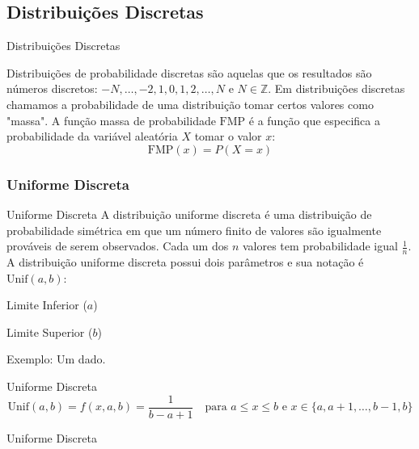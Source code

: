 \subsection{Distribuições Discretas}
\begin{frame}{Distribuições Discretas}
	\begin{defn}
		Distribuições de probabilidade discretas são aquelas que os resultados são números
		discretos: $-N, \dots, -2, 1, 0,1,2,\dots, N$ e $N \in \mathbb{Z}$. Em distribuições discretas chamamos a
		probabilidade de uma distribuição tomar certos valores como "massa". A função massa de probabilidade
		$\text{FMP}$ é a função que especifica a probabilidade da variável aleatória $X$ tomar o valor $x$:
		$$\text{FMP}(x) = P(X = x)$$
	\end{defn}
\end{frame}

\subsubsection{Uniforme Discreta}
\begin{frame}{Uniforme Discreta}
	A distribuição uniforme discreta é uma distribuição de probabilidade simétrica em que um número finito de valores
	são igualmente prováveis de serem observados. Cada um dos $n$ valores tem probabilidade igual $\frac{1}{n}$.
	\vfill
	A distribuição uniforme discreta possui dois parâmetros e sua notação é $\text{Unif}(a, b)$:
	\begin{vfilleditems}
		\item Limite Inferior ($a$)
		\item Limite Superior ($b$)
	\end{vfilleditems}
	\vfill
	Exemplo: Um dado.
\end{frame}

\begin{frame}{Uniforme Discreta}
	$$\text{Unif}(a,b) = f(x, a, b) = \frac{1}{b-a+1} \quad \text{para $a \leq x \leq b$ e $x\in \{a,a+1,\dots ,b-1,b\}$}$$
\end{frame}

\begin{frame}{Uniforme Discreta}
	\centering
\end{frame}

